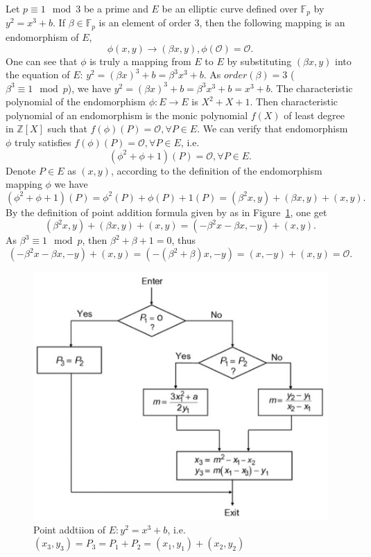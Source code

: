 \documentclass{article}
\newcommand{\Z}{\mathbb{Z}}
\newcommand{\F}{\mathbb{F}}
\begin{document}
Let $p\equiv 1 \mod 3$ be a prime and $E$ be an elliptic curve defined over $\F_p$ by $y^2 = x^3 + b$.
If $\beta\in\F_p$ is an element of order 3, then the following mapping is an endomorphism of $E$,
$$\phi(x,y) \rightarrow (\beta x, y), \phi(\mathcal{O}) = \mathcal{O}.$$
One can see that $\phi$ is truly a mapping from $E$ to $E$ by 
substituting $(\beta x, y)$ into the equation of $E$: $y^2 = (\beta x)^3 + b = \beta^3x^3 + b$.
As $order(\beta)=3$ ($\beta^3 \equiv 1 \mod p$), we have $y^2 = (\beta x)^3 + b = \beta^3x^3 + b  = x^3 + b$.
The characteristic polynomial of the endomorphism $\phi: E \rightarrow E$ is $X^2 + X + 1$.
Then characteristic polynomial of an endomorphism is the monic polynomial $f(X)$ of least degree in $\Z[X]$
such that $f(\phi)(P)=\mathcal{O}, \forall P\in E$. 
We can verify that endomorphism $\phi$ truly satisfies $f(\phi)(P)=\mathcal{O}, \forall P\in E$, i.e.
$$(\phi^2+\phi+1)(P) = \mathcal{O}, \forall P \in E.$$
Denote $P\in E$ as $(x,y)$, according to the definition of the endomorphism mapping $\phi$ we have 
$$(\phi^2+\phi+1)(P) = \phi^2(P) + \phi(P) +1(P) = (\beta^2 x, y) + (\beta x, y) + (x,y).$$
By the definition of point addition formula given by \cite{Blahut14} as in Figure~\ref{fig-ecpoint-add}, one get 
 $$(\beta^2 x, y) + (\beta x, y) + (x,y) = (-\beta^2 x -\beta x, -y) + (x,y).$$
 As $\beta^3 \equiv 1 \mod p$, then $\beta^2+\beta+1=0$, thus
 $$ (-\beta^2 x -\beta x, -y) + (x,y) = (-(\beta^2+\beta) x, -y) = (x,-y) + (x,y) = \mathcal{O}.$$


\begin{figure}
\centering
\includegraphics[width=.7\textwidth]{ec-point-addition.png}
\caption{Point addtiion of $E: y^2=x^3+b$, i.e. $(x_3,y_3)=P_3=P_1+P_2=(x_1,y_1) + (x_2,y_2)$}\label{fig-ecpoint-add}
\end{figure}
\end{document}
